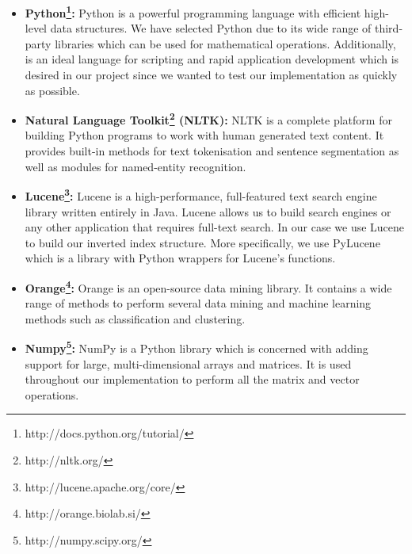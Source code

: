 \begin{itemize}
 \item \textbf{Python\footnote{http://docs.python.org/tutorial/}:} Python is a powerful programming language with efficient high-level data structures. We have selected Python due to its wide range of third-party libraries which can be used for mathematical operations. Additionally, is an ideal language for scripting and rapid application development which is desired in our project since we wanted to test our implementation as quickly as possible.  
 \item \textbf{Natural Language Toolkit\footnote{http://nltk.org/} (NLTK):} NLTK is a complete platform for building Python programs to work with human generated text content. It provides built-in methods for text tokenisation and sentence segmentation as well as modules for named-entity recognition.    
 \item \textbf{Lucene\footnote{http://lucene.apache.org/core/}:} Lucene is a high-performance, full-featured text search engine library written entirely in Java. Lucene allows us to build search engines or any other application that requires full-text search. In our case we use Lucene to build our inverted index structure. More specifically, we use PyLucene which is a library with Python wrappers for Lucene's functions.
 \item \textbf{Orange\footnote{http://orange.biolab.si/}:} Orange is an open-source data mining library. It contains a wide range of methods to perform several data mining and machine learning methods such as classification and clustering.    
 \item \textbf{Numpy\footnote{http://numpy.scipy.org/}:} NumPy is a Python library which is concerned with adding support for large, multi-dimensional arrays and matrices. It is used throughout our implementation to perform all the matrix and vector operations.
\end{itemize}\vspace{15pt}

